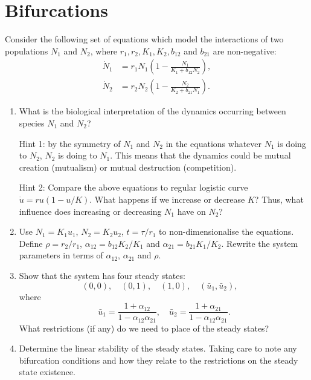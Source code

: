 \documentclass[]{article}
\newcommand{\bb}{\begin{equation}}
\newcommand{\ee}{\end{equation}}
\renewcommand{\l}{\left(}
\renewcommand{\r}{\right)}
\begin{document}
\section{Bifurcations}
Consider the following set of equations which model the interactions of two populations $N_1$ and $N_2$, where $r_1, r_2, K_1, K_2, b_{12}$ and $b_{21}$ are non-negative:
\begin{align}
\dot{N}_1&=r_1N_1\l 1-\frac{N_1}{K_1+b_{12}N_2}\r,\\
\dot{N}_2&=r_2N_2\l 1-\frac{N_2}{K_2+b_{21}N_1}\r.
\end{align}
\begin{enumerate}
\item What is the biological interpretation of the dynamics occurring between species $N_1$ and $N_2$?

Hint 1: by the symmetry of $N_1$ and $N_2$ in the equations whatever $N_1$ is doing to $N_2$, $N_2$ is doing to $N_1$. This means that the dynamics could be mutual creation (mutualism) or mutual destruction (competition).

Hint 2: Compare the above equations to regular logistic curve $\dot{u}=ru(1-u/K)$. What happens if we increase or decrease $K$? Thus, what influence does increasing or decreasing $N_1$ have on $N_2$?

\item Use $N_1=K_1u_1$, $N_2=K_2u_2$, $t=\tau/r_1$ to non-dimensionalise the equations. Define $\rho=r_2/r_1$, $\alpha_{12}=b_{12}K_2/K_1$ and $\alpha_{21}=b_{21}K_1/K_2$. Rewrite the system parameters in terms of $\alpha_{12}$, $\alpha_{21}$ and $\rho$.

\item Show that the system has four steady states:
\bb
(0,0), \quad (0,1), \quad (1,0), \quad (\bar{u}_1,\bar{u}_2), \quad
\ee
where
\bb
\bar{u}_1=\frac{1+\alpha_{12}}{1-\alpha_{12}\alpha_{21}},\quad\bar{u}_2=\frac{1+\alpha_{21}}{1-\alpha_{12}\alpha_{21}}.
\ee
What restrictions (if any) do we need to place of the steady states?
\item Determine the linear stability of the steady states. Taking care to note any bifurcation conditions and how they relate to the restrictions on the steady state existence.
\end{enumerate}
\end{document}
